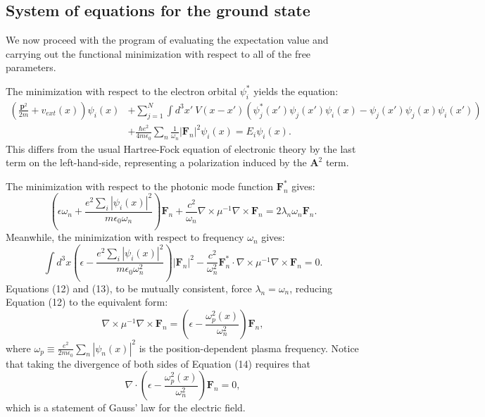 \documentclass[aps,prb,onecolumn,
	groupedaddress,superscriptaddress,
	amsfonts,amssymb,amsmath,floatfix,
	citeautoscript]{revtex4-1}
\begin{document}
\subsection{System of equations for the ground state}
We now proceed with the program of evaluating the expectation value and carrying out the functional minimization with respect to all of the free parameters. 

The minimization with respect to the electron orbital $\psi_i^*$ yields the equation:
\begin{align}
\left(\frac{\mathbf{p}^2}{2m}+v_{ext}(x) \right)\psi_i(x) &+  \sum\limits_{j=1}^N \int d^3x' ~ V(x-x')\left(\psi^*_j(x')\psi_j(x')\psi_i(x) - \psi_j(x')\psi_j(x)\psi_i(x')  \right) \nonumber \\ &+ \frac{\hbar e^2}{4m\epsilon_0}\sum_n \frac{1}{\omega_n}|\mathbf{F}_n|^2\psi_i(x)  = E_i\psi_i(x).
\end{align}
This differs from the usual Hartree-Fock equation of electronic theory by the last term on the left-hand-side, representing a polarization induced by the $\mathbf{A}^2$ term.

The minimization with respect to the photonic mode function $\mathbf{F}_n^*$ gives:
\begin{equation}
\left(\epsilon\omega_n+\frac{e^2\sum_i|\psi_i(x)|^2}{m\epsilon_0\omega_n} \right)\mathbf{F}_n + \frac{c^2}{\omega_n}\nabla\times\mu^{-1}\nabla\times\mathbf{F}_n = 2\lambda_n\omega_n\mathbf{F}_n.
\end{equation}
Meanwhile, the minimization with respect to frequency $\omega_n$ gives:
\begin{equation}
\int d^3x\left(\epsilon - \frac{e^2\sum_i|\psi_i(x)|^2}{m\epsilon_0\omega^2_n}\right)|\mathbf{F}_n|^2 - \frac{c^2}{\omega_n^2}\mathbf{F}_n^*\cdot\nabla\times\mu^{-1}\nabla\times\mathbf{F}_n=0.
\end{equation}
Equations (12) and (13), to be mutually consistent, force $\lambda_n = \omega_n$, reducing Equation (12) to the equivalent form:
\begin{equation}
\nabla\times\mu^{-1}\nabla\times\mathbf{F}_n = \left(\epsilon - \frac{\omega_p^2(x)}{\omega_n^2} \right)\mathbf{F}_n,
\end{equation}
where $\omega_p \equiv \frac{e^2}{2m\epsilon_0}\sum_n|\psi_n(x)|^2$ is the position-dependent plasma frequency. Notice that taking the divergence of both sides of Equation (14) requires that
\begin{equation}
\nabla\cdot\left(\epsilon - \frac{\omega_p^2(x)}{\omega_n^2} \right)\mathbf{F}_n = 0,
\end{equation}
which is a statement of Gauss' law for the electric field.
\end{document}
